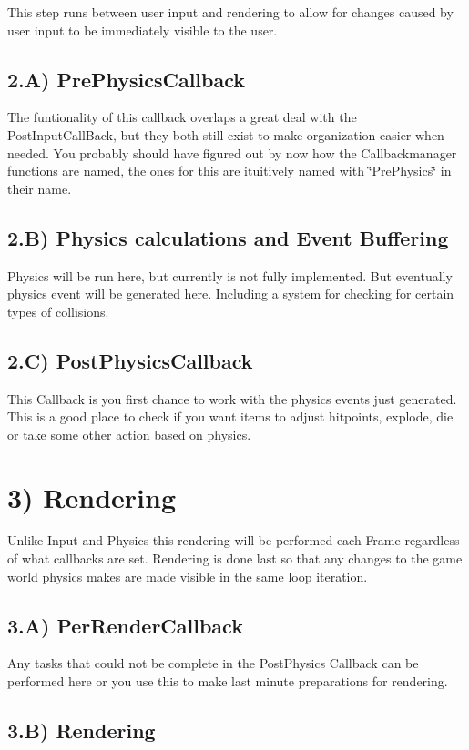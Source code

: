 This step runs between user input and rendering to allow for changes caused by user input to be immediately visible to the user. \hypertarget{dd/d99/mainloop1_physics1}{}\subsection{2.A) PrePhysicsCallback}\label{dd/d99/mainloop1_physics1}
The funtionality of this callback overlaps a great deal with the PostInputCallBack, but they both still exist to make organization easier when needed. You probably should have figured out by now how the Callbackmanager functions are named, the ones for this are ituitively named with \char`\"{}PrePhysics\char`\"{} in their name. \hypertarget{dd/d99/mainloop1_physics2}{}\subsection{2.B) Physics calculations and Event Buffering}\label{dd/d99/mainloop1_physics2}
Physics will be run here, but currently is not fully implemented. But eventually physics event will be generated here. Including a system for checking for certain types of collisions. \hypertarget{dd/d99/mainloop1_physics3}{}\subsection{2.C) PostPhysicsCallback}\label{dd/d99/mainloop1_physics3}
This Callback is you first chance to work with the physics events just generated. This is a good place to check if you want items to adjust hitpoints, explode, die or take some other action based on physics. \par
 \hypertarget{dd/d99/mainloop1_callbacks3}{}\section{3) Rendering}\label{dd/d99/mainloop1_callbacks3}
Unlike Input and Physics this rendering will be performed each Frame regardless of what callbacks are set. Rendering is done last so that any changes to the game world physics makes are made visible in the same loop iteration. \hypertarget{dd/d99/mainloop1_rendering1}{}\subsection{3.A) PerRenderCallback}\label{dd/d99/mainloop1_rendering1}
Any tasks that could not be complete in the PostPhysics Callback can be performed here or you use this to make last minute preparations for rendering. \hypertarget{dd/d99/mainloop1_rendering2}{}\subsection{3.B) Rendering}\label{dd/d99/mainloop1_rendering2}
